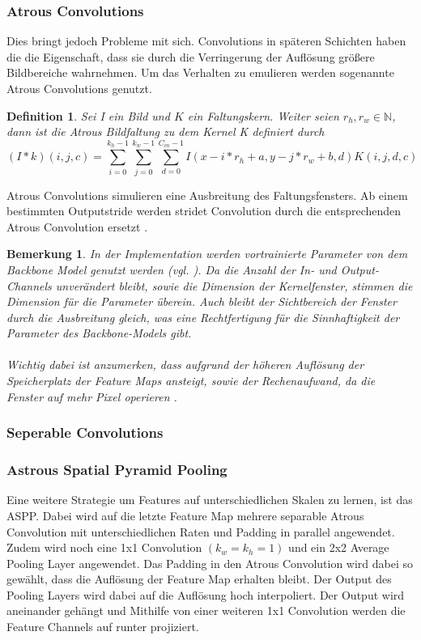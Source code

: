 \documentclass[12pt,DIV=15,BCOR=15mm,twoside,headsepline,abstract=true,listof=totoc,bibliography=totoc]{scrreprt}
\newtheorem{remark}{Bemerkung}[chapter]
\newtheorem{defi}{Definition}
\theoremstyle{remark}    %
\begin{document}
    \subsubsection{Atrous Convolutions}
    Dies bringt jedoch Probleme mit sich. Convolutions in späteren Schichten haben die die Eigenschaft, dass sie durch die Verringerung
    der Auflösung größere Bildbereiche wahrnehmen. Um das Verhalten zu emulieren werden sogenannte Atrous Convolutions genutzt. 
    \begin{defi}
    Sei I ein Bild und $K$ ein Faltungskern. Weiter seien $r_h, r_w \in \mathbb{N}$, dann ist die 
    Atrous Bildfaltung zu dem Kernel K definiert durch 
    \[
    (I * k)(i, j, c) = \sum_{i =0}^{k_h-1}\sum_{j=0}^{k_w-1} \sum_{d = 0}^{C_{in}-1}I(x-i*r_h +a, y-j*r_w+b, d)K(i,j,d,c)
    \]
    \end{defi}
    Atrous Convolutions simulieren eine Ausbreitung des Faltungsfensters. Ab einem bestimmten Outputstride werden stridet Convolution durch 
    die entsprechenden Atrous Convolution ersetzt \cite{chen2017rethinkingatrousconvolutionsemantic}.
    \begin{remark}
    \label{bem:backboneparam}
        In der Implementation werden vortrainierte Parameter von dem Backbone Model genutzt werden (vgl. \cite{chen2017rethinkingatrousconvolutionsemantic,HaitzHuebnerUlrich2022}). 
        Da die Anzahl der In- und Output-Channels unverändert bleibt, 
        sowie die Dimension der Kernelfenster, stimmen die Dimension für die Parameter überein. Auch bleibt der Sichtbereich der Fenster durch die 
        Ausbreitung gleich, was eine Rechtfertigung für die Sinnhaftigkeit der Parameter des Backbone-Models gibt.\\\\
        Wichtig dabei ist anzumerken, dass aufgrund der höheren Auflösung der Speicherplatz der Feature Maps ansteigt, sowie der Rechenaufwand, da die Fenster auf 
        mehr Pixel operieren . \cite{Deeplabv3plus_PyTorch}
    \end{remark}

    \subsubsection{Seperable Convolutions}

    \subsubsection{Astrous Spatial Pyramid Pooling}
    Eine weitere Strategie um Features auf unterschiedlichen Skalen zu lernen, ist das \ac{ASPP}. Dabei wird auf die letzte Feature
    Map mehrere separable Atrous Convolution mit unterschiedlichen Raten und Padding in parallel angewendet. Zudem wird noch eine 1x1 Convolution $(k_w = k_h = 1)$
    und ein 2x2 Average Pooling Layer angewendet. Das Padding in den Atrous Convolution wird dabei so gewählt, dass die Auflösung der Feature Map erhalten
    bleibt. Der Output des Pooling Layers wird dabei auf die Auflösung hoch interpoliert. Der Output wird aneinander gehängt und Mithilfe von einer 
    weiteren 1x1 Convolution werden die Feature Channels auf runter projiziert.\cite{chen2017rethinkingatrousconvolutionsemantic}
    
\end{document}
